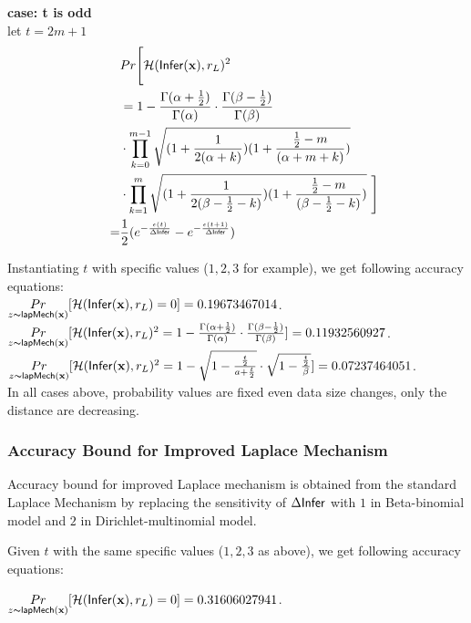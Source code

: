 \documentclass{article}
\begin{document}
  \noindent \textbf{case: t is odd}\\
  let $t = 2 m + 1$
  \begin{align*}
  & Pr\Bigg[ \mathcal{H}(\mathsf{Infer}(\textbf{x}), r_L )^2 \\
  & =
  1 - \frac{\Gamma(\alpha+\frac{1}{2})}{\Gamma(\alpha)} \cdot
\frac{\Gamma(\beta - \frac{1}{2})}{\Gamma(\beta)}\\
\qquad &\cdot 
  \prod_{k = 0}^{m-1}
  \sqrt{(1 + \frac{1}{2(\alpha + k)})
  (1 + \frac{\frac{1}{2} - m}{(\alpha + m  + k)})
  } \\
  \qquad & \cdot 
  \prod_{k = 1}^{m} 
  \sqrt{(1 + \frac{1}{2(\beta - \frac{1}{2}- k)})(1 + \frac{\frac{1}{2} - m}{(\beta - \frac{1}{2}- k)})}\ \Bigg] \\
  = & \frac{1}{2} (e^{- \frac{\epsilon (t)}{\Delta \mathsf{Infer}}} - e^{- \frac{\epsilon (t + 1)}{\Delta \mathsf{Infer}}})\\
  \end{align*}

  Instantiating $t$ with specific values ($1, 2, 3$ for example), we get following accuracy equations:\\
  $\underset{z \thicksim \mathsf{lapMech}(\textbf{x})}{Pr}[\mathcal{H}(\mathsf{Infer}(\textbf{x}), r_L ) = 0] = 0.19673467014$.\\
  $\underset{z \thicksim \mathsf{lapMech}(\textbf{x})}{Pr}[\mathcal{H}(\mathsf{Infer}(\textbf{x}), r_L )^2 = 1 - \frac{\Gamma(\alpha+\frac{1}{2})}{\Gamma(\alpha)} \cdot
  \frac{\Gamma(\beta - \frac{1}{2})}{\Gamma(\beta)} ] = 0.11932560927$.\\  
  $\underset{z \thicksim \mathsf{lapMech}(\textbf{x})}{Pr}[\mathcal{H}(\mathsf{Infer}(\textbf{x}), r_L )^2 = 1 - 
  \sqrt{1 - \frac{\frac{t}{2}}{a + \frac{t}{2}}}
  \cdot
  \sqrt{1 - \frac{\frac{t}{2}}{\beta}}] = 0.07237464051$.\\
In all cases above, probability values are fixed even data size changes, only the distance are decreasing.

\subsubsection{Accuracy Bound for Improved Laplace Mechanism}
\label{subsec_accuracy_lap}
Accuracy bound for improved Laplace mechanism is obtained from the standard Laplace Mechanism by replacing the sensitivity of $\Delta \mathsf{Infer}$ with $1$ in Beta-binomial model and $2$ in Dirichlet-multinomial model.

Given $t$ with the same specific values ($1, 2, 3$ as above), we get following accuracy equations:

  $\underset{z \thicksim \mathsf{lapMech}(\textbf{x})}{Pr}[\mathcal{H}(\mathsf{Infer}(\textbf{x}), r_L ) = 0] = 0.31606027941$.
\end{document}
